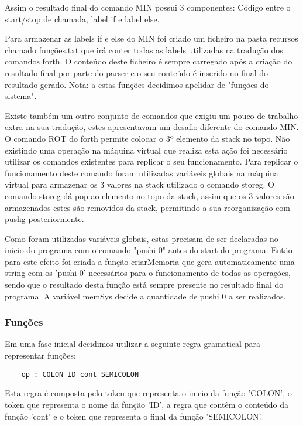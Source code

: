 \documentclass{article}
\begin{document}
Assim o resultado final do comando MIN possui 3 componentes: Código entre o start/stop de chamada, label if e label else.

Para armazenar as labels if e else do MIN foi criado um ficheiro na pasta recursos chamado funções.txt que irá conter todas as labels utilizadas na tradução dos comandos forth. O conteúdo deste ficheiro é sempre carregado após a criação do resultado final por parte do parser e o seu conteúdo é inserido no final do resultado gerado. Nota: a estas funções decidimos apelidar de "funções do sistema". 

Existe também um outro conjunto de comandos que exigiu um pouco de trabalho extra na sua tradução, estes apresentavam um desafio diferente do comando MIN. O comando ROT do forth permite colocar o 3º elemento da stack no topo. Não existindo uma operação na máquina virtual que realiza esta ação foi necessário utilizar os comandos existentes para replicar o seu funcionamento. Para replicar o funcionamento deste comando foram utilizadas variáveis globais na máquina virtual para armazenar os 3 valores na stack utilizado o comando storeg. O comando storeg dá pop ao elemento no topo da stack, assim que os 3 valores são armazenados estes são removidos da stack, permitindo a sua reorganização com pushg posteriormente.

Como foram utilizadas variáveis globais, estas precisam de ser declaradas no inicio do programa com o comando "pushi 0" antes do start do programa.
Então para este efeito foi criada a função criarMemoria que gera automaticamente uma string com os 'pushi 0' necessários para o funcionamento de todas as operações, sendo que o resultado desta função está sempre presente no resultado final do programa. A variável memSys decide a quantidade de pushi 0 a ser realizados.






\subsubsection{Funções}
Em uma fase inicial decidimos utilizar a seguinte regra gramatical para representar funções: 

\begin{verbatim}
    op : COLON ID cont SEMICOLON
\end{verbatim}

Esta regra é composta pelo token que representa o inicio da função 'COLON', o token que representa o nome da função 'ID', a regra que contêm o conteúdo da função 'cont' e o token que representa o final da função 'SEMICOLON'. 
\end{document}
